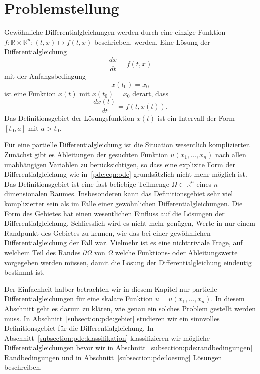 %
%
%
\section{Problemstellung
\label{section:pde:problem}}
Gewöhnliche Differentialgleichungen werden durch eine einzige Funktion
$f\colon \mathbb R\times\mathbb R^n: (t,x)\mapsto f(t,x)$ beschrieben,
werden.
Eine Lösung der Differentialgleichung
\begin{equation}
\frac{dx}{dt} = f(t,x)
\label{pde:eqn:ode}
\end{equation}
mit der Anfangsbedingung
\[
x(t_0) = x_0
\]
ist eine Funktion $x(t)$ mit $x(t_0)=x_0$ derart, dass 
\[
\frac{dx(t)}{dt} = f(t, x(t)).
\]
Das Definitionsgebiet der Lösungsfunktion $x(t)$ ist ein Intervall
der Form $[t_0,a]$ mit $a>t_0$.

Für eine partielle Differentialgleichung ist die Situation wesentlich
komplizierter.
Zunächst gibt es Ableitungen der gesuchten Funktion $u(x_1,\dots,x_n)$
nach allen unabhängigen Variablen zu
berücksichtigen, so dass eine explizite Form der Differentialgleichung
wie in~\eqref{pde:eqn:ode} grundsätzlich nicht mehr möglich ist.
Das Definitionsgebiet ist eine fast beliebige Teilmenge
$\Omega\subset\mathbb R^n$ eines $n$-dimensionalen Raumes.
Insbesonderen kann das Definitionsgebiet sehr viel komplizierter sein
als im Falle einer gewöhnlichen Differentialgleichungen.
Die Form des Gebietes hat einen wesentlichen Einfluss auf die Lösungen
der Differentialgleichung.
Schliesslich wird es nicht mehr genügen, Werte in nur einem Randpunkt
des Gebietes zu kennen, wie das bei einer gewöhnlichen Differentialgleichung
der Fall war.
Vielmehr ist es eine nichttriviale Frage, auf welchem Teil des Randes
$\partial\Omega$ von $\Omega$ welche Funktions- oder Ableitungswerte
vorgegeben werden müssen, damit die Lösung der Differentialgleichung
eindeutig bestimmt ist.

Der Einfachheit halber betrachten wir in diesem Kapitel nur partielle
Differentialgleichungen für eine skalare Funktion $u=u(x_1,\dots,x_n)$.
In diesem Abschnitt geht es darum zu klären, wie genau ein solches
Problem gestellt werden muss.
In Abschnitt~\ref{subsection:pde:gebiet} studieren wir ein sinnvolles
Definitionsgebiet für die Differentialgleichung.
In Abschnitt~\ref{subsection:pde:klassifikation} klassifizieren wir
mögliche Differentialgleichungen bevor wir in
Abschnitt~\ref{subsection:pde:randbedingungen} Randbedingungen und
in Abschnitt~\ref{subsection:pde:loesung} Lösungen beschreiben.

